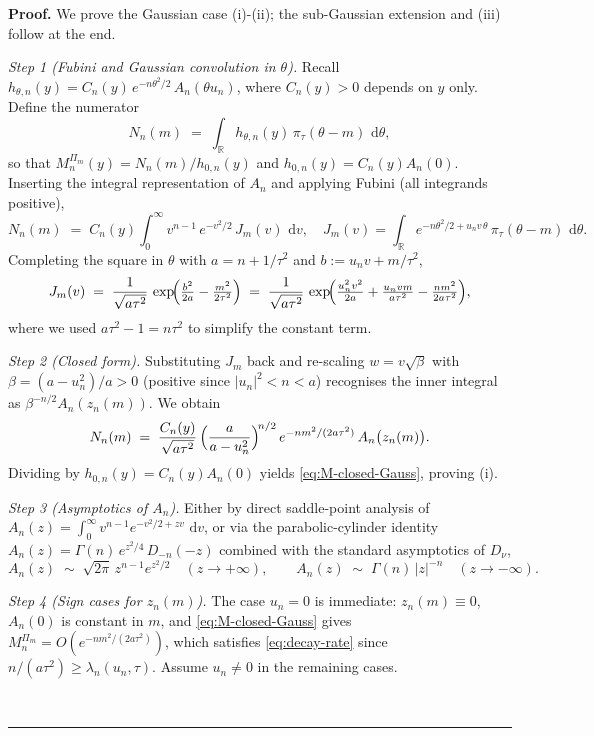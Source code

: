 \documentclass{article}%
\newenvironment{proof}[1][Proof]{\noindent\textbf{#1.} }{\ \rule{0.5em}{0.5em}}
\newcommand{\dd}{\,\mathrm{d}}
\newcommand{\1}{\mathbf{1}}
\begin{document}
\begin{proof}
    We prove the Gaussian case (i)-(ii); the sub-Gaussian extension and (iii) follow at the end.
 
\emph{Step 1 (Fubini and Gaussian convolution in $\theta$).} Recall $h_{\theta,n}(y) = C_{n}(y)\, e^{-n\theta^{2}/2}\, A_{n}(\theta u_{n})$, where $C_{n}(y)>0$ depends on $y$ only. Define the numerator
\[
   N_{n}(m) \;=\; \int_{\mathbb R} h_{\theta,n}(y)\,\pi_{\tau}(\theta-m)\,\dd\theta,
\]
so that $M_{n}^{\Pi_{m}}(y)=N_{n}(m)/h_{0,n}(y)$ and $h_{0,n}(y)=C_{n}(y)A_{n}(0)$. Inserting the integral representation of $A_{n}$ and applying Fubini (all integrands positive),
\[
   N_{n}(m) \;=\; C_{n}(y)\int_{0}^{\infty}v^{n-1}\,e^{-v^{2}/2}\, J_{m}(v)\,\dd v,
   \quad
   J_{m}(v)=\int_{\mathbb R} e^{-n\theta^{2}/2+u_{n}v\,\theta}\,\pi_{\tau}(\theta-m)\,\dd\theta.
\]
Completing the square in $\theta$ with $a=n+1/\tau^{2}$ and $b:=u_{n}v+m/\tau^{2}$,
\[
   J_{m}(v) \;=\; \frac{1}{\sqrt{a\tau^{2}}}\, \exp\!\Bigl(\tfrac{b^{2}}{2a}-\tfrac{m^{2}}{2\tau^{2}}\Bigr)
   \;=\; \frac{1}{\sqrt{a\tau^{2}}}\, \exp\!\Bigl(\tfrac{u_{n}^{2}v^{2}}{2a}+\tfrac{u_{n}vm}{a\tau^{2}}-\tfrac{nm^{2}}{2a\tau^{2}}\Bigr),
\]
where we used $a\tau^{2}-1=n\tau^{2}$ to simplify the constant term.

\emph{Step 2 (Closed form).} Substituting $J_{m}$ back and re-scaling $w=v\sqrt{\beta}$ with $\beta =(a-u_{n}^{2})/a>0$ (positive since $|u_{n}|^{2}<n<a$) recognises the inner integral as $\beta^{-n/2}A_{n}(z_{n}(m))$. We obtain
\[
   N_{n}(m) \;=\; \frac{C_{n}(y)}{\sqrt{a\tau^{2}}}\,\Bigl(\frac{a}{a-u_{n}^{2}}\Bigr)^{\!n/2}\, e^{-nm^{2}/(2a\tau^{2})}\, A_{n}\bigl(z_{n}(m)\bigr).
\]
Dividing by $h_{0,n}(y)=C_{n}(y)A_{n}(0)$ yields \eqref{eq:M-closed-Gauss}, proving (i).

\emph{Step 3 (Asymptotics of $A_{n}$).} Either by direct saddle-point analysis of $A_{n}(z)=\int_{0}^{\infty}v^{n-1}e^{-v^{2}/2+zv}\,\dd v$, or via the parabolic-cylinder identity $A_{n}(z)=\Gamma(n)\,e^{z^{2}/4}\,D_{-n}(-z)$ combined with the standard asymptotics of $D_{\nu}$,
\begin{equation}\label{eq:An-asymptotics}
   A_{n}(z)\;\sim\;\sqrt{2\pi}\,z^{n-1}e^{z^{2}/2}\quad (z\to+\infty),
   \qquad
   A_{n}(z)\;\sim\;\Gamma(n)\,|z|^{-n}\quad (z\to-\infty).
\end{equation}

\emph{Step 4 (Sign cases for $z_{n}(m)$).} The case $u_{n}=0$ is immediate: $z_{n}(m)\equiv 0$, $A_{n}(0)$ is constant in $m$, and \eqref{eq:M-closed-Gauss} gives $M_{n}^{\Pi_{m}}=O(e^{-nm^{2}/(2a\tau^{2})})$, which satisfies \eqref{eq:decay-rate} since $n/(a\tau^{2})\ge \lambda_{n}(u_{n},\tau)$. Assume $u_{n}\ne 0$ in the remaining cases.
 

\end{proof}
\end{document}
